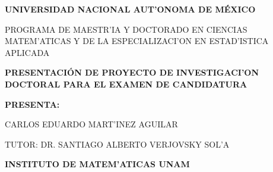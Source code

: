 \documentclass[letterpaper]{report}
\begin{document}
\begin{titlepage}
\begin{center}

\LARGE\textbf{ UNIVERSIDAD NACIONAL AUT'ONOMA DE M\'EXICO}
\vspace*{0.3cm}

\small PROGRAMA DE MAESTR'IA Y DOCTORADO EN CIENCIAS MATEM'ATICAS Y DE LA ESPECIALIZACI'ON EN ESTAD'ISTICA APLICADA
\vspace*{2cm}

\large\textbf{PRESENTACI\'ON DE PROYECTO DE INVESTIGACI'ON DOCTORAL PARA EL EXAMEN DE CANDIDATURA}
\vspace*{2cm}

\small\textbf{PRESENTA:}
\vspace*{0.2cm}

\small CARLOS EDUARDO MART'INEZ AGUILAR
\vspace*{0.2cm}

\small TUTOR: DR. SANTIAGO ALBERTO VERJOVSKY SOL'A
\vspace*{0.2cm}

\small \textbf{INSTITUTO DE MATEM'ATICAS UNAM}
\vspace*{2.5cm}

\end{center}
\end{titlepage}

\end{document}
